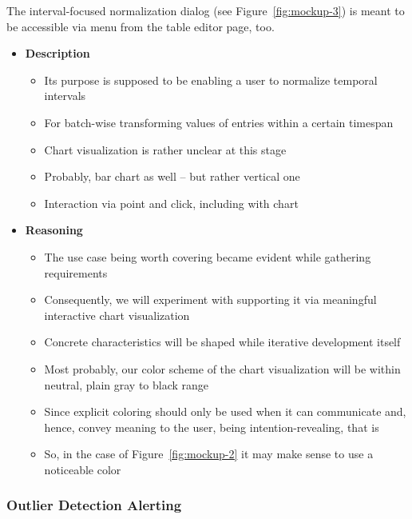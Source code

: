 The interval-focused normalization dialog (see Figure~\ref{fig:mockup-3}) is meant to be accessible via menu from the table editor page, too.

\begin{itemize}
  \item \textbf{Description}
  \begin{itemize}
    \item Its purpose is supposed to be enabling a user to normalize temporal intervals
    \item For batch-wise transforming values of entries within a certain timespan
    \item Chart visualization is rather unclear at this stage
    \item Probably, bar chart as well -- but rather vertical one
    \item Interaction via point and click, including with chart
  \end{itemize}
  \item \textbf{Reasoning}
  \begin{itemize}
    \item The use case being worth covering became evident while gathering requirements
    \item Consequently, we will experiment with supporting it via meaningful interactive chart visualization
    \item Concrete characteristics will be shaped while iterative development itself
    \item Most probably, our color scheme of the chart visualization will be within neutral, plain gray to black range
    \item Since explicit coloring should only be used when it can communicate and, hence, convey meaning to the user, being intention-revealing, that is
    \item So, in the case of Figure~\ref{fig:mockup-2} it may make sense to use a noticeable color
  \end{itemize}
\end{itemize}


\subsubsection{Outlier Detection Alerting}

